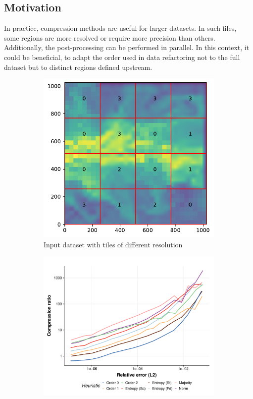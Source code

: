 \documentclass[conference]{IEEEtran}
\theoremstyle{remark}
\begin{document}
\subsection{Motivation}
In practice, compression methods are useful for larger datasets.%
In such files, some regions are more resolved or require more precision than others. Additionally, the post-processing can be performed in parallel.
In this context, it could be beneficial, to adapt the order used in data refactoring not to the full dataset but to distinct regions defined upstream.
\begin{figure}[h]
\begin{subfigure}[b]{0.33\linewidth}
    \centering
    \includegraphics[width=0.90\linewidth]{Img/fun_grid.pdf}
    \caption{\centering Input dataset with tiles of different resolution}
    \label{fig:fun2d}
\end{subfigure}
\begin{subfigure}[b]{0.33\linewidth}
    \centering
    \includegraphics[width=0.90\linewidth]{Img/adaptive_2d.pdf}

\end{subfigure}
\end{figure}
\end{document}
